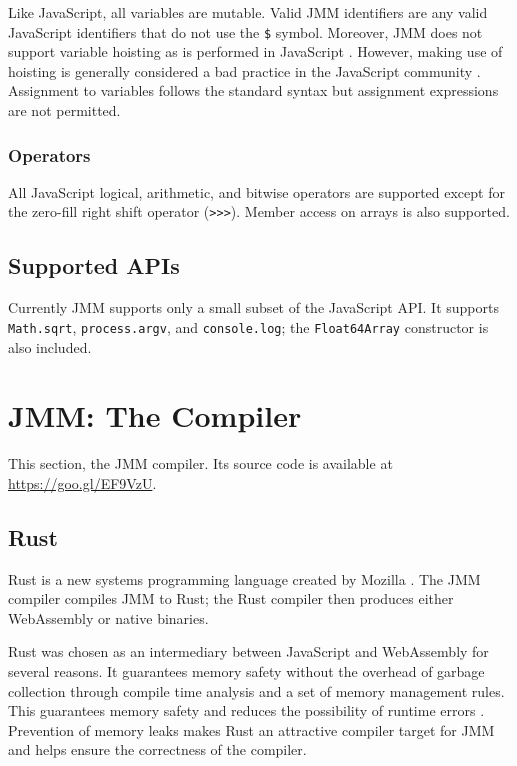 \documentclass[12pt]{article}
\begin{document}
	Like JavaScript, all variables are mutable. Valid JMM identifiers are any valid JavaScript identifiers that do not use the \texttt{\$} symbol. Moreover, JMM does not support variable hoisting as is performed in JavaScript \cite{mdnvar}. However, making use of hoisting is generally considered a bad practice in the JavaScript community \cite{mdnvar}. Assignment to variables follows the standard syntax but assignment expressions are not permitted.

	\subsubsection{Operators}
	
	All JavaScript logical, arithmetic, and bitwise operators are supported except for the zero-fill right shift operator (\texttt{>>>}). Member access on arrays is also supported.
	
	\subsection{Supported APIs}
	
	Currently JMM supports only a small subset of the JavaScript API. It supports \texttt{Math.sqrt}, \texttt{process.argv}, and \texttt{console.log}; the \texttt{Float64Array} constructor is also included.
	
	\section{JMM: The Compiler}
	This section, the JMM compiler. Its source code is available at \url{https://goo.gl/EF9VzU}.
	
	\subsection{Rust}
	
	Rust is a new systems programming language created by Mozilla \cite{Rust}. The JMM compiler compiles JMM to Rust; the Rust compiler then produces either WebAssembly or native binaries.
	
	Rust was chosen as an intermediary between JavaScript and WebAssembly for several reasons. It guarantees memory safety without the overhead of garbage collection through compile time analysis and a set of memory management rules. This guarantees memory safety and reduces the possibility of runtime errors \cite{Klabnik}. Prevention of memory leaks makes Rust an attractive compiler target for JMM and helps ensure the correctness of the compiler.
	
\end{document}
